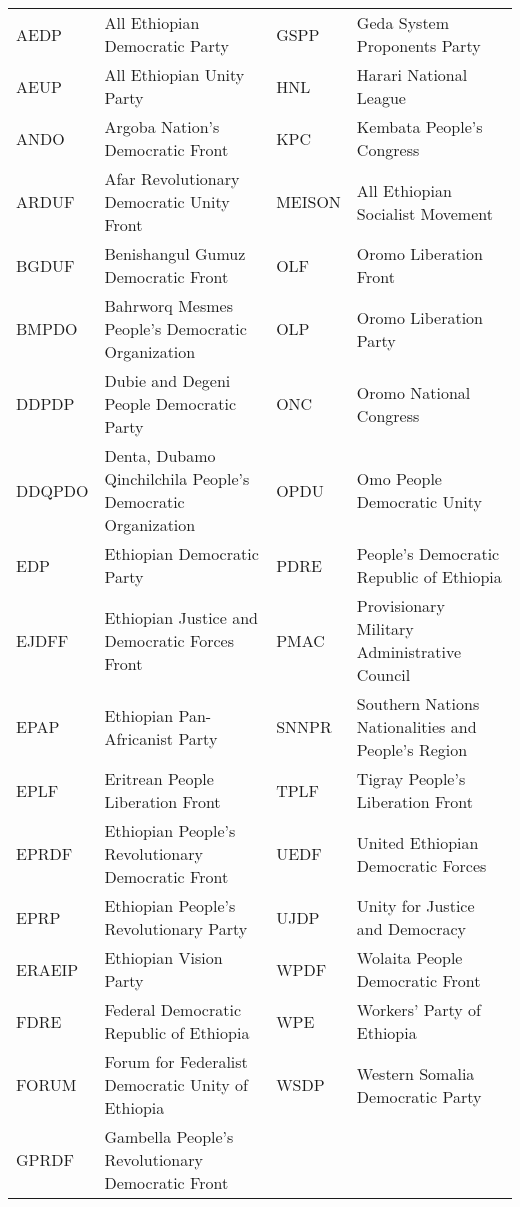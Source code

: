 \documentclass[output=paper,modfonts]{langscibook}
\begin{document}
\begin{tabularx}{\textwidth}{lQlQ}
AEDP &    All Ethiopian Democratic Party                                       & GSPP &    Geda System Proponents Party \\
AEUP &    All Ethiopian Unity Party                                            & HNL &    Harari National League \\
ANDO &  Argoba Nation’s Democratic Front                                       & KPC &    Kembata People’s Congress \\
ARDUF &  {Afar} Revolutionary Democratic Unity Front                             & MEISON &  All Ethiopian Socialist Movement \\
BGDUF &  Benishangul {Gumuz} Democratic Front                                    & OLF &    {Oromo} Liberation Front \\
BMPDO &  Bahrworq {Mesmes} People’s Democratic Organization                      & OLP &    {Oromo} Liberation Party \\
DDPDP &  Dubie and Degeni People Democratic Party                              & ONC &    {Oromo} National Congress \\
DDQPDO &  Denta, Dubamo Qinchilchila People’s Democratic Organization          & OPDU &  {Omo} People Democratic Unity \\
EDP &    Ethiopian Democratic Party                                            & PDRE &    People’s Democratic Republic of {Ethiopia} \\
EJDFF &  Ethiopian Justice and Democratic Forces Front                         & PMAC &  Provisionary Military Administrative Council \\
EPAP &    Ethiopian Pan-Africanist Party                                       & SNNPR &  Southern Nations Nationalities and People’s Region \\
EPLF &     Eritrean People Liberation Front                                    & TPLF &    Tigray People’s Liberation Front \\
EPRDF &  Ethiopian People’s Revolutionary Democratic Front                     & UEDF &    United Ethiopian Democratic Forces \\
EPRP &    Ethiopian People’s Revolutionary Party                               & UJDP &    Unity for Justice and Democracy \\
ERAEIP &  Ethiopian Vision Party                                               &   WPDF &  Wolaita People Democratic Front \\
FDRE &    Federal Democratic Republic of {Ethiopia}                              &    WPE &    Workers’ Party of {Ethiopia}  \\
 FORUM &  Forum for Federalist Democratic Unity of {Ethiopia}                    &   WSDP &  Western {Somalia} Democratic Party \\
GPRDF &  Gambella People’s Revolutionary Democratic Front                    & & \\                                                                        
\end{tabularx}                        
\printbibliography[heading=subbibliography,notkeyword=this]
\end{document}
